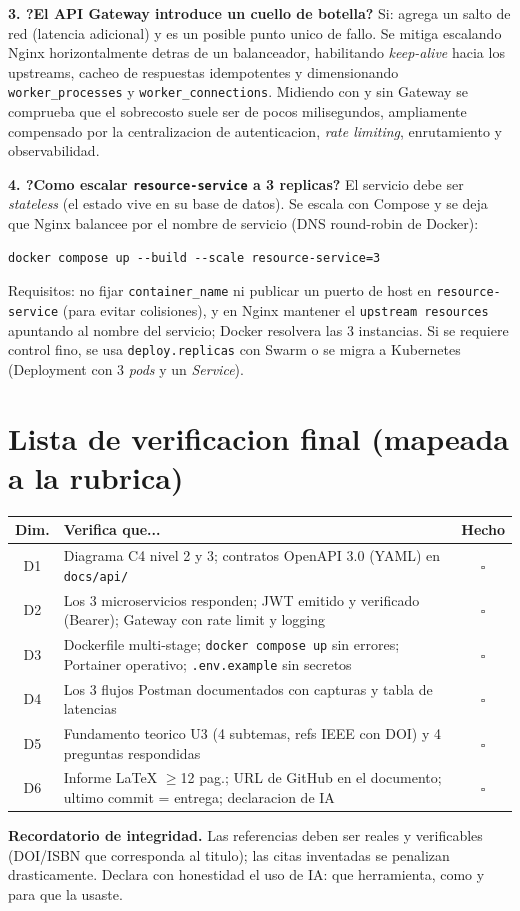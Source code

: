\documentclass[11pt]{article}
\begin{document}
\textbf{3. ?El API Gateway introduce un cuello de botella?} Si: agrega un salto de red (latencia adicional) y es un posible punto unico de fallo. Se mitiga escalando Nginx horizontalmente detras de un balanceador, habilitando \emph{keep-alive} hacia los upstreams, cacheo de respuestas idempotentes y dimensionando \texttt{worker\_processes} y \texttt{worker\_connections}. Midiendo con y sin Gateway se comprueba que el sobrecosto suele ser de pocos milisegundos, ampliamente compensado por la centralizacion de autenticacion, \emph{rate limiting}, enrutamiento y observabilidad.

\textbf{4. ?Como escalar \texttt{resource-service} a 3 replicas?} El servicio debe ser \emph{stateless} (el estado vive en su base de datos). Se escala con Compose y se deja que Nginx balancee por el nombre de servicio (DNS round-robin de Docker):
\begin{lstlisting}[language=shell]
docker compose up --build --scale resource-service=3
\end{lstlisting}
Requisitos: no fijar \texttt{container\_name} ni publicar un puerto de host en \texttt{resource-service} (para evitar colisiones), y en Nginx mantener el \texttt{upstream resources} apuntando al nombre del servicio; Docker resolvera las 3 instancias. Si se requiere control fino, se usa \texttt{deploy.replicas} con Swarm o se migra a Kubernetes (Deployment con 3 \emph{pods} y un \emph{Service}).

\section*{\textcolor{azulOscuro}{Lista de verificacion final (mapeada a la rubrica)}}
\begin{center}\small
\begin{tabularx}{\textwidth}{cX c}
\toprule
\textbf{Dim.} & \textbf{Verifica que...} & \textbf{Hecho} \\
\midrule
D1 & Diagrama C4 nivel 2 y 3; contratos OpenAPI 3.0 (YAML) en \texttt{docs/api/} & $\square$ \\
D2 & Los 3 microservicios responden; JWT emitido y verificado (Bearer); Gateway con rate limit y logging & $\square$ \\
D3 & Dockerfile multi-stage; \texttt{docker compose up} sin errores; Portainer operativo; \texttt{.env.example} sin secretos & $\square$ \\
D4 & Los 3 flujos Postman documentados con capturas y tabla de latencias & $\square$ \\
D5 & Fundamento teorico U3 (4 subtemas, refs IEEE con DOI) y 4 preguntas respondidas & $\square$ \\
D6 & Informe LaTeX $\geq$12 pag.; URL de GitHub en el documento; ultimo commit = entrega; declaracion de IA & $\square$ \\
\bottomrule
\end{tabularx}
\end{center}

\begin{nota}
\small \textbf{Recordatorio de integridad.} Las referencias deben ser reales y verificables (DOI/ISBN que corresponda al titulo); las citas inventadas se penalizan drasticamente. Declara con honestidad el uso de IA: que herramienta, como y para que la usaste.
\end{nota}
\end{document}
